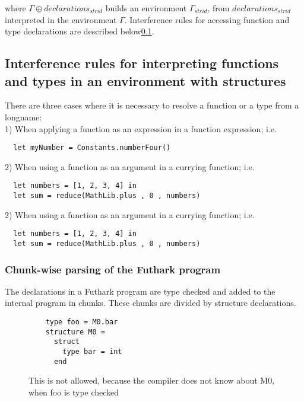 where $\Gamma \oplus declarations_{strid}$ builds an environment
$\Gamma_{strid}$, from $declarations_{strid}$ interpreted in the environment
$\Gamma$. Interference rules for accessing function and type declarations are
described below\ref{interpretingfunctionsandtypeswithstructures}.

\subsection{Interference rules for interpreting functions and types in an
  environment with structures}\label{interpretingfunctionsandtypeswithstructures}
There are three cases where it is necessary to resolve a function or a type from a
longname:\\

1) When applying a function as an expression in a function expression; i.e.
\begin{verbatim}
  let myNumber = Constants.numberFour()
\end{verbatim}

2) When using a function as an argument in a currying function; i.e.
\begin{verbatim}
  let numbers = [1, 2, 3, 4] in
  let sum = reduce(MathLib.plus , 0 , numbers)
\end{verbatim}

2) When using a function as an argument in a currying function; i.e.
\begin{verbatim}
  let numbers = [1, 2, 3, 4] in
  let sum = reduce(MathLib.plus , 0 , numbers)
\end{verbatim}




\subsubsection{Chunk-wise parsing of the Futhark program}
The declarations in a Futhark program are type checked and added to the internal program in
chunks.
These chunks are divided by structure declarations.

\begin{figure}
  \begin{verbatim}
    type foo = M0.bar
    structure M0 =
      struct
        type bar = int
      end
  \end{verbatim}
  \caption{This is not allowed, because the compiler does not know about M0,
    when foo is type checked}
\end{figure}

